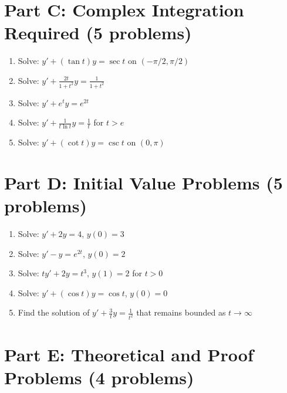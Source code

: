 \documentclass[12pt]{article}
\begin{document}
\section*{Part C: Complex Integration Required (5 problems)}

\begin{enumerate}[resume]
\item Solve: $y' + (\tan t)y = \sec t$ on $(-\pi/2, \pi/2)$

\item Solve: $y' + \frac{2t}{1+t^2}y = \frac{1}{1+t^2}$

\item Solve: $y' + e^t y = e^{2t}$

\item Solve: $y' + \frac{1}{t\ln t}y = \frac{1}{t}$ for $t > e$

\item Solve: $y' + (\cot t)y = \csc t$ on $(0, \pi)$
\end{enumerate}

\section*{Part D: Initial Value Problems (5 problems)}

\begin{enumerate}[resume]
\item Solve: $y' + 2y = 4$, $y(0) = 3$

\item Solve: $y' - y = e^{2t}$, $y(0) = 2$

\item Solve: $ty' + 2y = t^3$, $y(1) = 2$ for $t > 0$

\item Solve: $y' + (\cos t)y = \cos t$, $y(0) = 0$

\item Find the solution of $y' + \frac{3}{t}y = \frac{1}{t^2}$ that remains bounded as $t \to \infty$
\end{enumerate}

\section*{Part E: Theoretical and Proof Problems (4 problems)}
\end{document}
